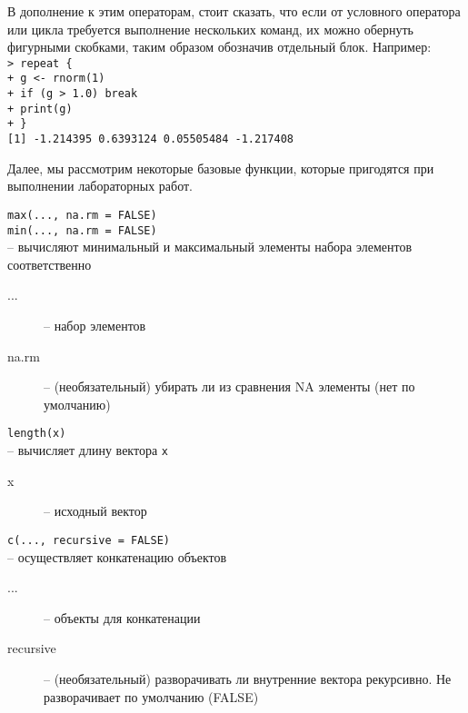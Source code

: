     В дополнение к этим операторам, стоит сказать, что если от условного оператора или цикла
    требуется выполнение нескольких команд, их можно обернуть фигурными скобками, таким 
    образом обозначив отдельный блок. Например: \\
    \indent\texttt{> repeat \{} \\
    \indent\texttt{+ g <- rnorm(1)} \\
    \indent\texttt{+ if (g > 1.0) break} \\ 
    \indent\texttt{+ print(g)} \\
    \indent\texttt{+ \}} \\
    \indent\texttt{[1] -1.214395 0.6393124 0.05505484 -1.217408} 

    Далее, мы рассмотрим некоторые базовые функции, которые пригодятся при выполнении 
    лабораторных работ.
    \begin{mdframed}[style=BadassFrame]
        \texttt{max(..., na.rm = FALSE) \\ min(..., na.rm = FALSE)} \\
        -- вычисляют минимальный и максимальный элементы набора элементов соответственно
        \begin{description}
            \item[...] -- набор элементов
            \item[na.rm] -- (необязательный) убирать ли из сравнения NA элементы (нет по 
                умолчанию)
        \end{description}
    \end{mdframed}

    \begin{mdframed}[style=BadassFrame]
        \texttt{length(x)} \\
        -- вычисляет длину вектора \texttt{x}
        \begin{description}
           \item[x] -- исходный вектор
        \end{description}
    \end{mdframed}
 
    \begin{mdframed}[style=BadassFrame]
        \texttt{c(..., recursive = FALSE)} \\
        -- осуществляет конкатенацию объектов
        \begin{description}
            \item[...] -- объекты для конкатенации
            \item[recursive] -- (необязательный) разворачивать ли внутренние 
                вектора рекурсивно.
            Не разворачивает по умолчанию (FALSE)
        \end{description}
    \end{mdframed}

